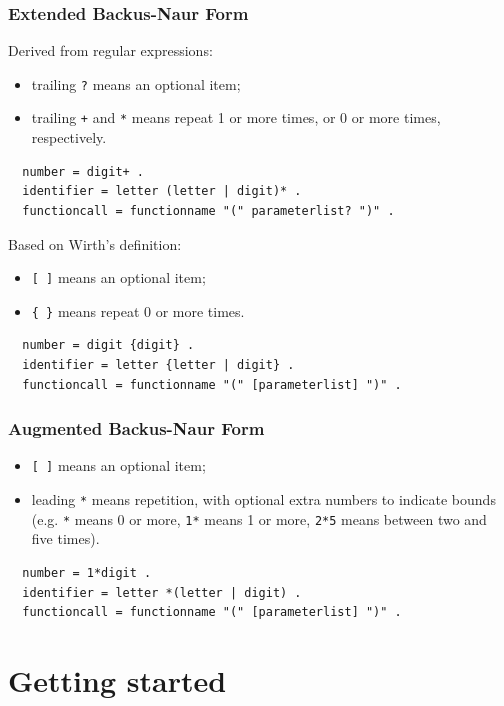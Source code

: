 \documentclass{beamer}
\begin{document}
\begin{frame}[fragile]
  \frametitle{Extended Backus-Naur Form}
  Derived from regular expressions:
  \begin{itemize}
    \item trailing%
      \texttt{?} means an optional item;
    \item trailing \texttt{+} and \texttt{*} means repeat 1 or more times, or 0
      or more times, respectively.
  \end{itemize}
  \begin{verbatim}
  number = digit+ .
  identifier = letter (letter | digit)* .
  functioncall = functionname "(" parameterlist? ")" .
  \end{verbatim}

  \vfill

  Based on Wirth's definition:
  \begin{itemize}
    \item \texttt{[ ]} means an optional item;
    \item \texttt{\{ \}} means repeat 0 or more times.
  \end{itemize}
  \begin{verbatim}
  number = digit {digit} .
  identifier = letter {letter | digit} .
  functioncall = functionname "(" [parameterlist] ")" .
  \end{verbatim}
\end{frame}

\begin{frame}[fragile]
  \frametitle{Augmented Backus-Naur Form}
  \begin{itemize}
    \item \texttt{[ ]} means an optional item;
    \item leading \texttt{*} means repetition, with optional extra numbers to
      indicate bounds (e.g. \texttt{*} means 0 or more, \texttt{1*} means 1 or
      more, \texttt{2*5} means between two and five times).
  \end{itemize}
  \vfill
  \begin{verbatim}
  number = 1*digit .
  identifier = letter *(letter | digit) .
  functioncall = functionname "(" [parameterlist] ")" .
  \end{verbatim}
\end{frame}

\section{Getting started}
\end{document}
